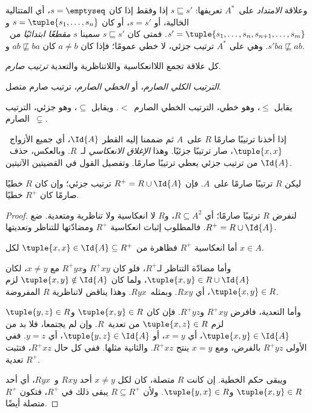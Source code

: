 \documentclass[../../../include/open-logic-section]{subfiles}
\begin{document}
\begin{ex}
وعلاقة \emph{الامتداد} على~$A^*$ تعريفها: $s \sqsubseteq s'$ إذا وفقط
إذا كان $s = \emptyseq$، أي المتتالية الخالية، أو $s = s'$، أو كان
$s = \tuple{s_1, \dots, s_n}$ و$s' = \tuple{s_1, \dots, s_n, s_{n+1}, \dots, s_m}$.
فمتى كان $s \sqsubseteq s'$ سمينا $s$ \emph{مقطعًا ابتدائيًا} من~$s'$.
وهي على $A^*$ ترتيب جزئي، لا خطي عمومًا؛ فإذا كان $a \neq b$ كان
$ab \not\sqsubseteq ba$ و$ba \not\sqsubseteq ab$.
\end{ex}

\begin{defn}
كل علاقة تجمع اللاانعكاسية واللاتناظرية والتعدية \emph{ترتيب صارم}.
\end{defn}

\begin{defn}
\emph{الترتيب الكلي الصارم}، أو \emph{الخطي الصارم}، ترتيب صارم متصل.
\end{defn}

\begin{ex}
يقابل $\le$، وهو خطي، الترتيب الخطي الصارم~$<$.
ويقابل $\subseteq$، وهو جزئي، الترتيب الصارم~$\subsetneq$.
\end{ex}

إذا أخذنا ترتيبًا صارمًا $R$ على~$A$ ثم ضممنا إليه القطر $\Id{A}$،
أي جميع الأزواج~$\tuple{x, x}$، صار ترتيبًا جزئيًا. وهذا
\emph{الإغلاق الانعكاسي} لـ~$R$. وبالعكس، حذف~$\Id{A}$ من ترتيب
جزئي يعطي ترتيبًا صارمًا. وتفصيل القول في القضيتين الآتيتين.

\begin{prop}
ليكن $R$ ترتيبًا صارمًا على~$A$. فإن $R^+ = R \cup \Id{A}$ ترتيب
جزئي؛ وإن كان $R$ خطيًا صارمًا كان $R^+$ خطيًا.
\end{prop}

\begin{proof}
لنفرض $R$ ترتيبًا صارمًا؛ أي $R \subseteq A^2$، و$R$ لا انعكاسية
ولا تناظرية ومتعدية. ضع $R^+ = R \cup \Id{A}$. فالمطلوب إثبات
انعكاسية $R^+$ ومضادّتها للتناظر وتعديتها.

أما انعكاسية $R^+$ فظاهرة من $\tuple{x, x} \in \Id{A} \subseteq
R^+$ لكل $x \in A$.

وأما مضادّة التناظر لـ$R^+$، فلو كان $R^+xy$ و$R^+yx$ مع
$x \neq y$، لكان $\tuple{x,y} \in R \cup \Id{A}$، ولما كان
$\tuple{x, y} \notin \Id{A}$ لزم $\tuple{x, y} \in R$، أي
$Rxy$. وبمثله~$Ryx$. وهذا يناقض لاتناظرية $R$ المفروضة.

وأما التعدية، فافرض $R^+xy$ و$R^+yz$. فإن كان
$\tuple{x, y} \in R$ و$\tuple{y,z} \in R$ لزم $\tuple{x, z} \in
R$ من تعدية~$R$. وإن لم يجتمعا، فلا بد من
$\tuple{x, y} \in \Id{A}$، أي $x = y$، أو $\tuple{y, z} \in \Id{A}$،
أي $y = z$. ففي الأولى $R^+yz$ بالفرض، ومع $x = y$ ينتج
$R^+xz$. والثانية مثلها. ففي كل حال $R^+xz$، فتثبت تعدية $R^+$.

ويبقى حكم الخطية. إن كانت $R$ متصلة، كان لكل $x \neq y$ أحد
$Rxy$ و~$Ryx$، أي أحد $\tuple{x, y} \in R$ و$\tuple{y, x} \in R$.
ولأن $R \subseteq R^+$ يبقى ذلك في $R^+$، فتكون $R^+$ متصلة أيضًا.
\end{proof}
\end{document}
